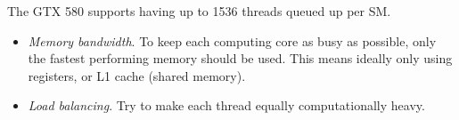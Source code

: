\documentclass[12pt,journal,captionsoff,onecolumn]{IEEEtran}
\newcounter{todoidx}
\newlength\marginparwidthsmall
\newcommand\todo[1]{%
      \addtocounter{todoidx}{1}%
      {\color{Red}\fbox{\bf\thetodoidx{}}}%
      \marginpar{%
         {\vspace*{-10pt}\color{Red}\fbox{\bf\thetodoidx{}}}\\%
         \fcolorbox{red}{todobackground}{\parbox{\marginparwidthsmall}{\scriptsize #1}}}}
\newcommand\todo[1]{}
\newcommand\mat[1]{\boldsymbol{#1}}
\newcommand\1{\vec 1}
\newcommand*\eR{\mat{\hat R}}
\begin{document}
The GTX 580 supports having up to 1536 threads queued up per SM. 






\begin{itemize}
\item \emph{Memory bandwidth}. To keep each computing core as busy as possible, only the fastest performing memory should be used. This means ideally only using registers, or L1 cache (shared memory).
\item \emph{Load balancing}. Try to make each thread equally computationally heavy.
\end{itemize}
\end{document}
